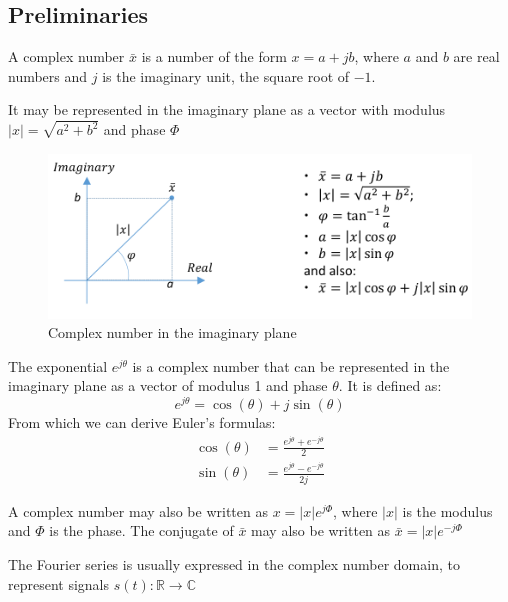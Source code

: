 \subsection{Preliminaries}
\begin{definition}
   A complex number $\bar{x}$ is a number of the form $x = a + jb$, where $a$ and $b$ are real numbers and $j$ is the imaginary unit, the square root of $-1$.

   It may be represented in the imaginary plane as a vector with modulus $|x| = \sqrt{a^2 + b^2}$ and phase $\Phi$

   \begin{figure}[htbp]
      \centering
      \includegraphics{images/complex_vector.png}
      \caption{Complex number in the imaginary plane}
      \label{fig:complex_vector}
   \end{figure}
\end{definition}

\begin{definition}
   The exponential $e^{j\theta}$ is a complex number that can be represented in the imaginary plane as a vector of modulus 1 and phase $\theta$. It is defined as:
   \begin{equation}
      e^{j\theta} = \cos(\theta) + j\sin(\theta)
   \end{equation}
   From which we can derive Euler's formulas:
   \begin{align}
      \cos(\theta) & = \frac{e^{j\theta} + e^{-j\theta}}{2}\\
      \sin(\theta) & = \frac{e^{j\theta} - e^{-j\theta}}{2j}
   \end{align}
\end{definition}

A complex number may also be written as $x = |x|e^{j\Phi}$, where $|x|$ is the modulus and $\Phi$ is the phase.
The conjugate of $\bar{x}$ may also be written as $\bar{x} = |x|e^{-j\Phi}$

The Fourier series is usually expressed in the complex number domain, to represent signals $s(t): \mathbb{R} \rightarrow \mathbb{C}$

